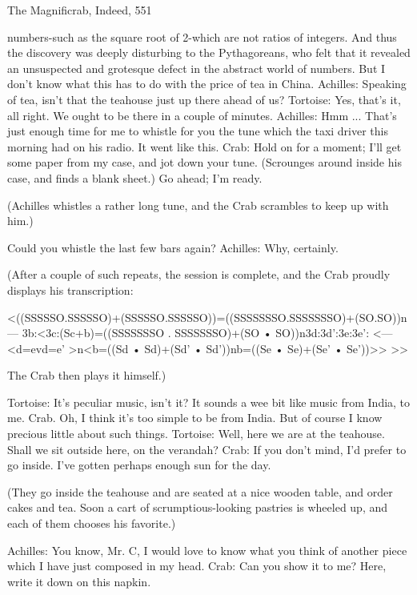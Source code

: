 {   The Magnificrab, Indeed,                                                                551

  numbers-such as the square root of 2-which are not ratios of integers. And thus the
  discovery was deeply disturbing to the Pythagoreans, who felt that it revealed an
  unsuspected and grotesque defect in the abstract world of numbers. But I don't know
  what this has to do with the price of tea in China.
Achilles: Speaking of tea, isn't that the teahouse just up there ahead of us?
Tortoise: Yes, that's it, all right. We ought to be there in a couple of minutes.
Achilles: Hmm ... That's just enough time for me to whistle for you the tune which the taxi
  driver this morning had on his radio. It went like this.
Crab: Hold on for a moment; I'll get some paper from my case, and jot
  down your tune. (Scrounges around inside his case, and finds a blank sheet.)
  Go ahead; I'm ready.

   (Achilles whistles a rather long tune, and the Crab scrambles to keep up with him.)

  Could you whistle the last few bars again?
Achilles: Why, certainly.

   (After a couple of such repeats, the session is complete, and the Crab proudly displays
   his transcription:

   <((SSSSSO.SSSSSO)+(SSSSSO.SSSSSO))=((SSSSSSSO.SSSSSSSO)+(SO.SO))n---
            3b:<3c:(Sc+b)=((SSSSSSSO . SSSSSSSO)+(SO • SO))n3d:3d':3e:3e':
         <---<d=evd=e' >n<b=((Sd • Sd)+(Sd' • Sd'))nb=((Se • Se)+(Se' • Se'))>> >>

   The Crab then plays it himself.)

Tortoise: It's peculiar music, isn't it? It sounds a wee bit like music from India, to me.
Crab. Oh, I think it's too simple to be from India. But of course I know precious little about
  such things.
Tortoise: Well, here we are at the teahouse. Shall we sit outside here, on the verandah?
Crab: If you don't mind, I'd prefer to go inside. I've gotten perhaps enough sun for the day.

   (They go inside the teahouse and are seated at a nice wooden table, and order cakes and
   tea. Soon a cart of scrumptious-looking pastries is wheeled up, and each of them chooses
   his favorite.)

Achilles: You know, Mr. C, I would love to know what you think of another piece which I
  have just composed in my head. Crab: Can you show it to me? Here, write it down on this
  napkin.

}
